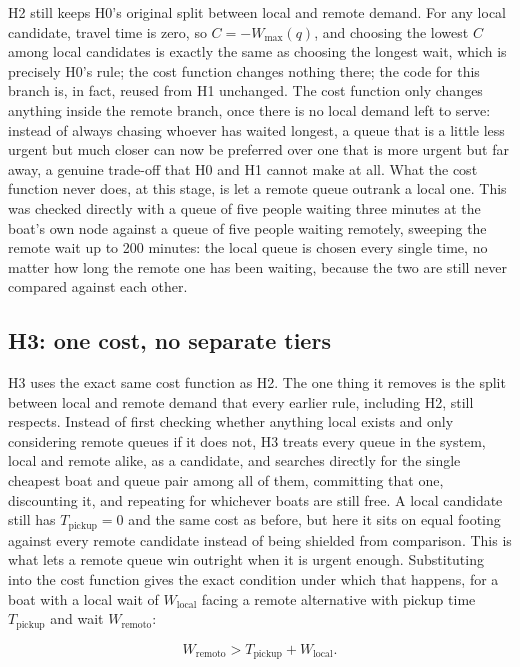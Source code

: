 \documentclass[11pt,a4paper]{article}
\begin{document}
H2 still keeps H0's original split between local and remote demand. For any local candidate, travel time is zero, so $C = -W_{\max}(q)$, and choosing the lowest $C$ among local candidates is exactly the same as choosing the longest wait, which is precisely H0's rule; the cost function changes nothing there; the code for this branch is, in fact, reused from H1 unchanged. The cost function only changes anything inside the remote branch, once there is no local demand left to serve: instead of always chasing whoever has waited longest, a queue that is a little less urgent but much closer can now be preferred over one that is more urgent but far away, a genuine trade-off that H0 and H1 cannot make at all. What the cost function never does, at this stage, is let a remote queue outrank a local one. This was checked directly with a queue of five people waiting three minutes at the boat's own node against a queue of five people waiting remotely, sweeping the remote wait up to 200 minutes: the local queue is chosen every single time, no matter how long the remote one has been waiting, because the two are still never compared against each other.

\subsection{H3: one cost, no separate tiers}
\label{sec:h3}

H3 uses the exact same cost function as H2. The one thing it removes is the split between local and remote demand that every earlier rule, including H2, still respects. Instead of first checking whether anything local exists and only considering remote queues if it does not, H3 treats every queue in the system, local and remote alike, as a candidate, and searches directly for the single cheapest boat and queue pair among all of them, committing that one, discounting it, and repeating for whichever boats are still free. A local candidate still has $T_{\text{pickup}}=0$ and the same cost as before, but here it sits on equal footing against every remote candidate instead of being shielded from comparison. This is what lets a remote queue win outright when it is urgent enough. Substituting into the cost function gives the exact condition under which that happens, for a boat with a local wait of $W_{\text{local}}$ facing a remote alternative with pickup time $T_{\text{pickup}}$ and wait $W_{\text{remoto}}$:

\begin{equation}
W_{\text{remoto}} > T_{\text{pickup}} + W_{\text{local}}.
\end{equation}
\end{document}
